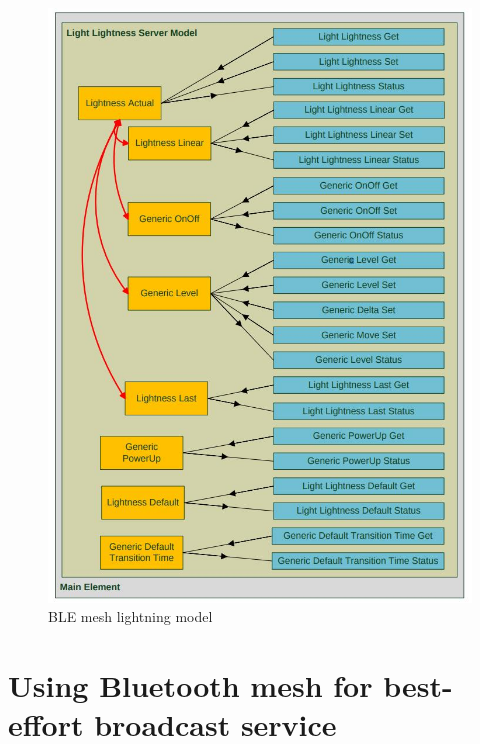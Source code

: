 \documentclass[\main/main.tex]{subfiles}
\begin{document}
\begin{figure}[H]
    \begin{center}
        \includegraphics[scale=0.3]{ble_mesh_lightning_model.jpg}
    \end{center}
    \caption{BLE mesh lightning model}
    \label{fig:ble_mesh_lightning_model}
\end{figure}

\section{Using Bluetooth mesh for best-effort broadcast service}
\end{document}
